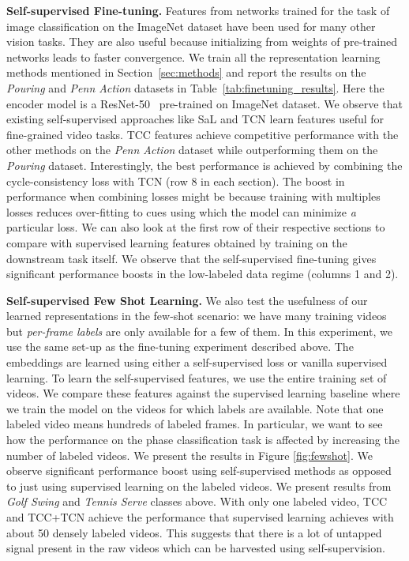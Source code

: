 \documentclass[10pt,twocolumn,letterpaper]{article}
\begin{document}
\noindent\textbf{Self-supervised Fine-tuning.} Features from networks trained for the task of image classification on the ImageNet dataset have been used for many other vision tasks. They are also useful because initializing from weights of pre-trained networks leads to faster convergence. We train all the representation learning methods mentioned in Section~\ref{sec:methods} and report the results on the \textit{Pouring} and \textit{Penn Action} datasets in Table~\ref{tab:finetuning_results}. Here the encoder model is a ResNet-50~\cite{he2016deep} pre-trained on ImageNet dataset. We observe that existing self-supervised approaches like SaL and TCN learn features useful for fine-grained video tasks. TCC features achieve competitive performance with the other methods on the \textit{Penn Action} dataset while outperforming them on the \textit{Pouring} dataset. Interestingly, the best performance is achieved by combining the cycle-consistency loss with TCN (row 8 in each section). The boost in performance when combining losses might be because training with multiples losses reduces over-fitting to cues using which the model can  minimize \textit{a} particular loss. We can also look at the first row of their respective sections to compare with supervised learning features obtained by training on the downstream task itself. We observe that the self-supervised fine-tuning gives significant performance boosts in the low-labeled data regime (columns 1 and 2).


\noindent\textbf{Self-supervised Few Shot Learning.} We also test the usefulness of our learned representations in the few-shot scenario: we have many training videos but \textit{per-frame labels} are only available for a few of them. In this experiment, we use the same set-up as the fine-tuning experiment described above. The embeddings are learned using either a self-supervised loss or vanilla supervised learning. To learn the self-supervised features, we use the entire training set of videos. We compare these features against the supervised learning baseline where we train the model on the videos for which labels are available. Note that one labeled video means hundreds of labeled frames. In particular, we want to see how the performance on the phase classification task is affected by increasing the number of labeled videos. We present the results in Figure \ref{fig:fewshot}. 
We observe significant performance boost using self-supervised methods as opposed to just using supervised learning on the labeled videos. We present results from \textit{Golf Swing} and \textit{Tennis Serve} classes above. With only one labeled video, TCC and TCC+TCN achieve the performance that supervised learning achieves with about 50 densely labeled videos. This suggests that there is a lot of untapped signal present in the raw videos which can be harvested using self-supervision.
\end{document}
